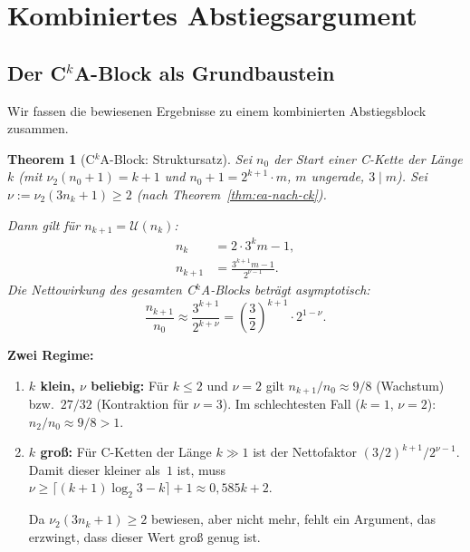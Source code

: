 \documentclass[12pt,a4paper]{article}
\newtheorem{theorem}[definition]{Theorem}
\newcommand{\vii}{\nu_2}
\newcommand{\U}{\mathcal{U}}
\begin{document}
\section{Kombiniertes Abstiegsargument}
\label{sec:abstieg}

\subsection{Der C$^k$A-Block als Grundbaustein}

Wir fassen die bewiesenen Ergebnisse zu einem kombinierten Abstiegsblock zusammen.

\begin{theorem}[C$^k$A-Block: Struktursatz]
\label{thm:cka}
Sei $n_0$ der Start einer C-Kette der Länge $k$ (mit $\vii(n_0+1) = k+1$ und
$n_0+1 = 2^{k+1} \cdot m$, $m$ ungerade, $3 \mid m$).
Sei $\nu := \vii(3n_k+1) \geq 2$ (nach Theorem~\ref{thm:ea-nach-ck}).

Dann gilt für $n_{k+1} = \U(n_k)$:
\begin{align*}
  n_k &= 2 \cdot 3^k m - 1,\\
  n_{k+1} &= \frac{3^{k+1}m - 1}{2^{\nu-1}}.
\end{align*}
Die Nettowirkung des gesamten C$^k$A-Blocks beträgt asymptotisch:
\[
  \frac{n_{k+1}}{n_0}
  \approx \frac{3^{k+1}}{2^{k+\nu}}
  = \left(\frac{3}{2}\right)^{k+1} \cdot 2^{1-\nu}.
\]
\end{theorem}

\begin{tcolorbox}[kernidee]
\textbf{Zwei Regime:}
\begin{enumerate}[label=(\arabic*)]
  \item \textbf{$k$ klein, $\nu$ beliebig:} Für $k \leq 2$ und $\nu = 2$
    gilt $n_{k+1}/n_0 \approx 9/8$ (Wachstum) bzw.\ $27/32$ (Kontraktion für $\nu=3$).
    Im schlechtesten Fall ($k=1$, $\nu=2$): $n_2/n_0 \approx 9/8 > 1$.

  \item \textbf{$k$ groß:} Für C-Ketten der Länge $k \gg 1$ ist der Nettofaktor
    $(3/2)^{k+1}/2^{\nu-1}$. Damit dieser kleiner als~$1$ ist, muss
    $\nu \geq \lceil (k+1)\log_2 3 - k \rceil + 1 \approx 0{,}585k + 2$.

    Da $\vii(3n_k+1) \geq 2$ bewiesen, aber nicht mehr, fehlt ein Argument,
    das erzwingt, dass dieser Wert groß genug ist.
\end{enumerate}
\end{tcolorbox}
\end{document}
